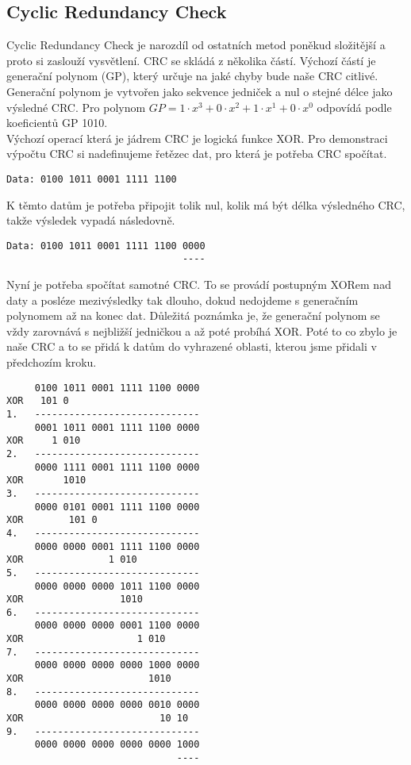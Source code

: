 \subsection{Cyclic Redundancy Check}
Cyclic Redundancy Check je narozdíl od ostatních metod poněkud složitější a proto si zaslouží vysvětlení. CRC se skládá z několika částí. Výchozí částí je generační polynom (GP), který určuje na jaké chyby bude naše CRC citlivé. Generační polynom je vytvořen jako sekvence jedniček a nul o stejné délce jako výsledné CRC. Pro polynom $GP=1 \cdot x^3 + 0 \cdot x^2 + 1 \cdot x^1 + 0 \cdot x^0$ odpovídá podle koeficientů GP 1010.\\
Výchozí operací která je jádrem CRC je logická funkce XOR. Pro demonstraci výpočtu CRC si nadefinujeme řetězec dat, pro která je potřeba CRC spočítat.
\begin{verbatim}
Data: 0100 1011 0001 1111 1100
\end{verbatim}
K těmto datům je potřeba připojit tolik nul, kolik má být délka výsledného CRC, takže výsledek vypadá následovně.
\begin{verbatim}
Data: 0100 1011 0001 1111 1100 0000
                               ----
\end{verbatim}
Nyní je potřeba spočítat samotné CRC. To se provádí postupným XORem nad daty a posléze mezivýsledky tak dlouho, dokud nedojdeme s generačním polynomem až na konec dat. Důležitá poznámka je, že generační polynom se vždy zarovnává s nejbližší jedničkou a až poté probíhá XOR. Poté to co zbylo je naše CRC a to se přidá k datům do vyhrazené oblasti, kterou jsme přidali v předchozím kroku.
\begin{verbatim}
     0100 1011 0001 1111 1100 0000
XOR   101 0
1.   -----------------------------
     0001 1011 0001 1111 1100 0000
XOR     1 010
2.   -----------------------------
     0000 1111 0001 1111 1100 0000
XOR       1010
3.   -----------------------------
     0000 0101 0001 1111 1100 0000
XOR        101 0
4.   -----------------------------
     0000 0000 0001 1111 1100 0000
XOR               1 010
5.   -----------------------------
     0000 0000 0000 1011 1100 0000
XOR                 1010 
6.   -----------------------------
     0000 0000 0000 0001 1100 0000
XOR                    1 010
7.   -----------------------------
     0000 0000 0000 0000 1000 0000
XOR                      1010
8.   -----------------------------
     0000 0000 0000 0000 0010 0000
XOR                        10 10
9.   -----------------------------
     0000 0000 0000 0000 0000 1000
                              ----
\end{verbatim}
